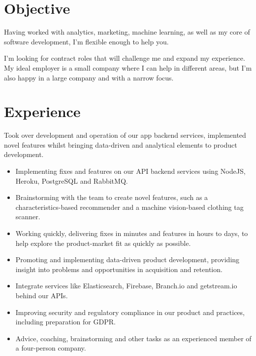 \documentclass[11pt,a4paper,sans]{moderncv}        %
\begin{document}
\makecvtitle

\section{Objective}
Having worked with analytics, marketing, machine learning, as well as my core of software development, I'm flexible enough to help you.

I'm looking for contract roles that will challenge me and expand my experience.
My ideal employer is a small company where I can help in different areas, but I'm also happy in a large company and with a narrow focus.

\section{Experience}
{Took over development and operation of our app backend services, implemented novel features whilst bringing data-driven and analytical elements to product development.
\newline{}
\begin{itemize}
\item Implementing fixes and features on our API backend services using NodeJS, Heroku, PostgreSQL and RabbitMQ.
\item Brainstorming with the team to create novel features, such as a characteristics-based recommender and a machine vision-based clothing tag scanner.
\item Working quickly, delivering fixes in minutes and features in hours to days, to help explore the product-market fit as quickly as possible.
\item Promoting and implementing data-driven product development, providing insight into problems and opportunities in acquisition and retention.
\item Integrate services like Elasticsearch, Firebase, Branch.io and getstream.io behind our APIs.
\item Improving security and regulatory compliance in our product and practices, including preparation for GDPR.
\item Advice, coaching, brainstorming and other tasks as an experienced member of a four-person company.
\end{itemize}
}
\end{document}
